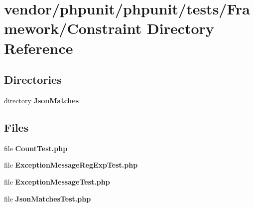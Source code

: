 \section{vendor/phpunit/phpunit/tests/\+Framework/\+Constraint Directory Reference}
\label{dir_8c64dc0305986f231ec3dbbef46719a7}
\subsection*{Directories}
\begin{DoxyCompactItemize}
\item 
directory {\bf Json\+Matches}
\end{DoxyCompactItemize}
\subsection*{Files}
\begin{DoxyCompactItemize}
\item 
file {\bf Count\+Test.\+php}
\item 
file {\bf Exception\+Message\+Reg\+Exp\+Test.\+php}
\item 
file {\bf Exception\+Message\+Test.\+php}
\item 
file {\bf Json\+Matches\+Test.\+php}
\end{DoxyCompactItemize}
